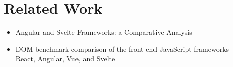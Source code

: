 \chapter{Related Work}

\begin{itemize}
    \item Angular and Svelte Frameworks: a Comparative Analysis \cite{tripon_angular_2021}
    \item DOM benchmark comparison of the front-end JavaScript frameworks \\React, Angular, Vue, and Svelte \cite{levlin_dom_2020}
\end{itemize}
